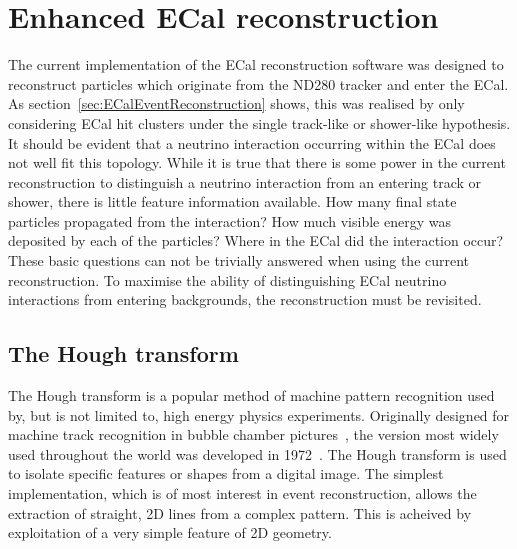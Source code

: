 


\chapter{Enhanced ECal reconstruction}
\label{chap:EnhancedECalReconstruction}
The current implementation of the ECal reconstruction software was designed to reconstruct particles which originate from the ND280 tracker and enter the ECal.  As section~\ref{sec:ECalEventReconstruction} shows, this was realised by only considering ECal hit clusters under the single track-like or shower-like hypothesis.  It should be evident that a neutrino interaction occurring within the ECal does not well fit this topology.  While it is true that there is some power in the current reconstruction to distinguish a neutrino interaction from an entering track or shower, there is little feature information available.  How many final state particles propagated from the interaction?  How much visible energy was deposited by each of the particles?  Where in the ECal did the interaction occur?  These basic questions can not be trivially answered when using the current reconstruction.  To maximise the ability of distinguishing ECal neutrino interactions from entering backgrounds, the reconstruction must be revisited.

\section{The Hough transform}
\label{sec:HoughTransform}
The Hough transform is a popular method of machine pattern recognition used by, but is not limited to, high energy physics experiments.  Originally designed for machine track recognition in bubble chamber pictures~\cite{Hough:1959qva}, the version most widely used throughout the world was developed in 1972~\cite{Duda:1972:UHT:361237.361242}.  The Hough transform is used to isolate specific features or shapes from a digital image.  The simplest implementation, which is of most interest in event reconstruction, allows the extraction of straight, 2D lines from a complex pattern.  This is acheived by exploitation of a very simple feature of 2D geometry.

